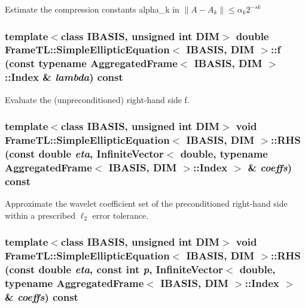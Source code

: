 Estimate the compression constants alpha\_\-k in $\|A-A_k\| \leq \alpha_k 2^{-sk}$ \hypertarget{classFrameTL_1_1SimpleEllipticEquation_20fd2926333555fbd8c4ecf6d062c2e5}{
\subsubsection[f]{\setlength{\rightskip}{0pt plus 5cm}template$<$class IBASIS, unsigned int DIM$>$ double {\bf FrameTL::SimpleEllipticEquation}$<$ IBASIS, DIM $>$::f (const typename {\bf AggregatedFrame}$<$ IBASIS, DIM $>$::{\bf Index} \& {\em lambda}) const}}
\label{classFrameTL_1_1SimpleEllipticEquation_20fd2926333555fbd8c4ecf6d062c2e5}


Evaluate the (unpreconditioned) right-hand side f. \hypertarget{classFrameTL_1_1SimpleEllipticEquation_2062b30008f73db23fa8b7415016ca00}{
\subsubsection[RHS]{\setlength{\rightskip}{0pt plus 5cm}template$<$class IBASIS, unsigned int DIM$>$ void {\bf FrameTL::SimpleEllipticEquation}$<$ IBASIS, DIM $>$::RHS (const double {\em eta}, \/  InfiniteVector$<$ double, typename {\bf AggregatedFrame}$<$ IBASIS, DIM $>$::{\bf Index} $>$ \& {\em coeffs}) const}}
\label{classFrameTL_1_1SimpleEllipticEquation_2062b30008f73db23fa8b7415016ca00}


Approximate the wavelet coefficient set of the preconditioned right-hand side within a prescribed $\ell_2$ error tolerance. \hypertarget{classFrameTL_1_1SimpleEllipticEquation_df01a8cf6b82866368e5c584a1fbbfa5}{
\subsubsection[RHS]{\setlength{\rightskip}{0pt plus 5cm}template$<$class IBASIS, unsigned int DIM$>$ void {\bf FrameTL::SimpleEllipticEquation}$<$ IBASIS, DIM $>$::RHS (const double {\em eta}, \/  const int {\em p}, \/  InfiniteVector$<$ double, typename {\bf AggregatedFrame}$<$ IBASIS, DIM $>$::{\bf Index} $>$ \& {\em coeffs}) const}}
\label{classFrameTL_1_1SimpleEllipticEquation_df01a8cf6b82866368e5c584a1fbbfa5}



